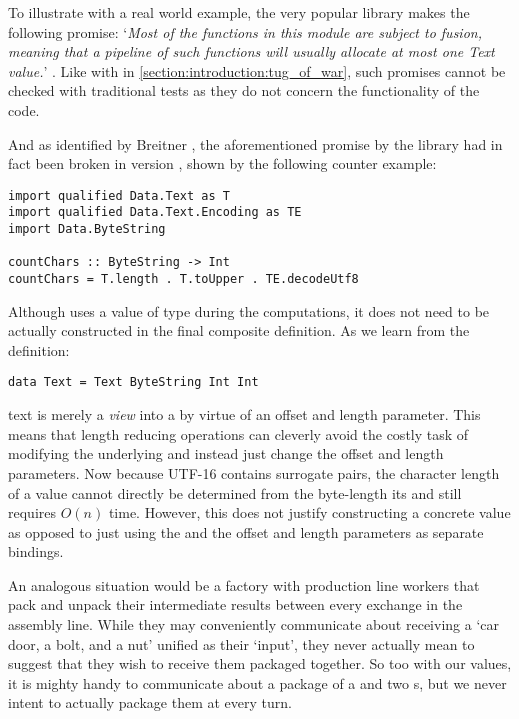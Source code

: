 To illustrate with a real world example, the very popular  library makes the following promise:
`\textit{Most of the functions in this module are subject to fusion, meaning that a pipeline of such functions will usually allocate at most one Text value.}'
\cite{inspection_testing}.
\label{section:introduction:inspection_testing}
Like with  in \cref{section:introduction:tug_of_war}, 
such promises cannot be checked with traditional tests as they do not concern the functionality of the code. 

And as identified by Breitner \cite{inspection_testing}, the aforementioned promise by the  library had in fact
been broken in version , shown by the following counter example:

\begin{verbatim}
import qualified Data.Text as T
import qualified Data.Text.Encoding as TE
import Data.ByteString

countChars :: ByteString -> Int
countChars = T.length . T.toUpper . TE.decodeUtf8
\end{verbatim}

Although  uses a value of type  during the computations, it does not
need to be actually constructed in the final composite definition. As we learn from the definition:

\begin{verbatim}
data Text = Text ByteString Int Int
\end{verbatim}

 text is merely a \textit{view} into a 
by virtue of an offset and length parameter. This means that length reducing operations can cleverly avoid the
costly task of modifying the underlying  and instead just change the offset and length parameters.
Now because UTF-16 contains surrogate pairs, the character length of a  value cannot directly be determined
from the byte-length its  and still requires $O(n)$ time. However, this does not justify constructing
a concrete  value as opposed to just using the  and the offset and length parameters as
separate bindings.

An analogous situation would be a factory with production line workers that
pack and unpack their intermediate results between every exchange in the assembly line. While they may
conveniently communicate about receiving a `car door, a bolt, and a nut' unified as their `input', they
never actually mean to suggest that they wish to receive them packaged together. So too with our  values,
it is mighty handy to communicate about a package of a  and two s, but we never intent to
actually package them at every turn.

